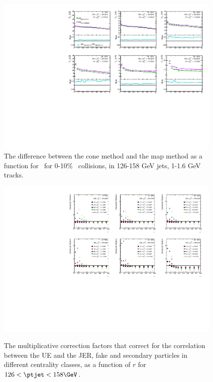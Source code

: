 \begin{figure}
\centerline{\includegraphics[page=2,width=1.\textwidth]{figures/main/UE/UE_x_ratio_c0}}
    \caption{The difference between the cone method and the map method as a function for \rvar\ for 0-10\% \pbpb\ collisions, in 126-158 GeV jets, 1-1.6 GeV tracks.}
    \label{fig:conemethod_mapmethod}
\end{figure}




\begin{figure}[ht]
\centerline{
\includegraphics[page=1,width=1.\textwidth]{figures/main/UE/UE_factors_r.pdf} \\
}
\caption{
The multiplicative correction factors that correct for the correlation between the UE and the JER, fake and secondary particles in different centrality classes, as a function of $r$ for $126 < \ptjet < 158 \GeV$.}
\label{fig:UEweights_r_jet0}
\end{figure}


